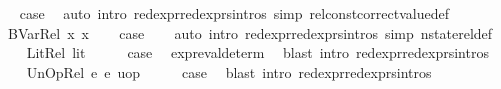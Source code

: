\begin{isabellebody}
\ \isamarkupfalse%
\ {\isacharquery}{\kern0pt}case\ \isamarkupfalse%
\ {\isacharparenleft}{\kern0pt}auto\ intro{\isacharcolon}{\kern0pt}\ red{\isacharunderscore}{\kern0pt}expr{\isacharunderscore}{\kern0pt}red{\isacharunderscore}{\kern0pt}exprs{\isachardot}{\kern0pt}intros\ simp{\isacharcolon}{\kern0pt}\ rel{\isacharunderscore}{\kern0pt}const{\isacharunderscore}{\kern0pt}correct{\isacharunderscore}{\kern0pt}value{\isacharunderscore}{\kern0pt}def{\isacharparenright}{\kern0pt}\isanewline
{}\isamarkupfalse%
\isanewline
\ \ \isamarkupfalse%
\ {\isacharparenleft}{\kern0pt}BVar{\isacharunderscore}{\kern0pt}Rel\ x{}\ x{}{\isacharparenright}{\kern0pt}\isanewline
\ \ \isamarkupfalse%
\ {\isacharquery}{\kern0pt}case\ \isanewline
\ \isamarkupfalse%
\ {\isacharparenleft}{\kern0pt}auto\ intro{\isacharcolon}{\kern0pt}\ red{\isacharunderscore}{\kern0pt}expr{\isacharunderscore}{\kern0pt}red{\isacharunderscore}{\kern0pt}exprs{\isachardot}{\kern0pt}intros\ simp{\isacharcolon}{\kern0pt}\ nstate{\isacharunderscore}{\kern0pt}rel{\isacharunderscore}{\kern0pt}def{\isacharparenright}{\kern0pt}\isanewline
{}\isamarkupfalse%
\isanewline
\ \ \isamarkupfalse%
\ {\isacharparenleft}{\kern0pt}Lit{\isacharunderscore}{\kern0pt}Rel\ lit{\isacharparenright}{\kern0pt}\isanewline
\ \ \isamarkupfalse%
\ \isamarkupfalse%
\ {\isacharquery}{\kern0pt}case\ \isamarkupfalse%
\ expr{\isacharunderscore}{\kern0pt}eval{\isacharunderscore}{\kern0pt}determ{\isacharparenleft}{\kern0pt}{}{\isacharparenright}{\kern0pt}\ \isamarkupfalse%
\ {\isacharparenleft}{\kern0pt}blast\ intro{\isacharcolon}{\kern0pt}\ red{\isacharunderscore}{\kern0pt}expr{\isacharunderscore}{\kern0pt}red{\isacharunderscore}{\kern0pt}exprs{\isachardot}{\kern0pt}intros{\isacharparenright}{\kern0pt}\isanewline
{}\isamarkupfalse%
\isanewline
\ \ \isamarkupfalse%
\ {\isacharparenleft}{\kern0pt}UnOp{\isacharunderscore}{\kern0pt}Rel\ e{}\ e{}\ uop{\isacharparenright}{\kern0pt}\isanewline
\ \ \isamarkupfalse%
\ \isamarkupfalse%
\ {\isacharquery}{\kern0pt}case\ \isamarkupfalse%
\ {\isacharparenleft}{\kern0pt}blast\ intro{\isacharcolon}{\kern0pt}\ red{\isacharunderscore}{\kern0pt}expr{\isacharunderscore}{\kern0pt}red{\isacharunderscore}{\kern0pt}exprs{\isachardot}{\kern0pt}intros{\isacharparenright}{\kern0pt}\isanewline

\end{isabellebody}
